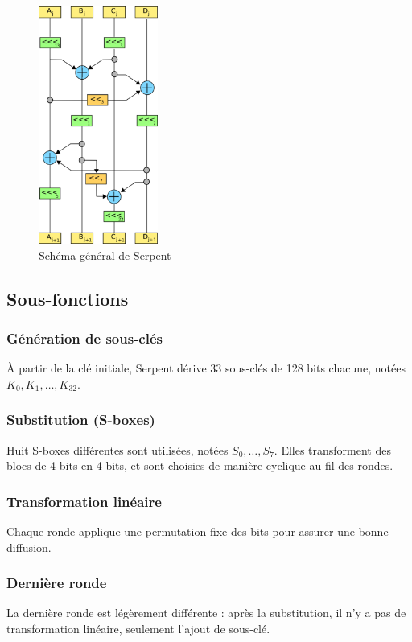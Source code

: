 \documentclass[12pt,a4paper]{report}
\begin{document}
\begin{figure}[h]
    \centering
    \includegraphics[width=0.35\textwidth]{assets/serpent-global.png}
    \caption{Schéma général de Serpent}
\end{figure}

\subsection{Sous-fonctions}

\subsubsection{Génération de sous-clés}
À partir de la clé initiale, Serpent dérive 33 sous-clés de 128 bits chacune, notées $K_0, K_1, \dots, K_{32}$.

\subsubsection{Substitution (S-boxes)}
Huit S-boxes différentes sont utilisées, notées $S_0, \dots, S_7$.  
Elles transforment des blocs de 4 bits en 4 bits, et sont choisies de manière cyclique au fil des rondes.

\subsubsection{Transformation linéaire}
Chaque ronde applique une permutation fixe des bits pour assurer une bonne diffusion.

\subsubsection{Dernière ronde}
La dernière ronde est légèrement différente : après la substitution, il n’y a pas de transformation linéaire, seulement l’ajout de sous-clé.
\end{document}
